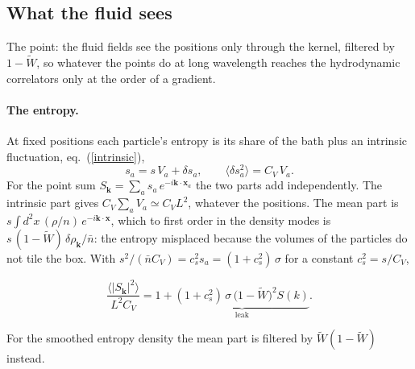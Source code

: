 \documentclass[11pt,aps,preprint,nofootinbib,superscriptaddress,tightenlines]{revtex4-2}
\newcommand{\avg}[1]{\langle #1\rangle}
\def\st{\begin{equation}}
\def\stp{\end{equation}}
\def\Eq#1{eq.~(\ref{#1})}
\let\oldparagraph\paragraph
\renewcommand{\paragraph}{\par\bigskip\oldparagraph}
\begin{document}
\subsection{What the fluid sees}
\label{sec:leak}

The point: the fluid fields see the positions only through the kernel, filtered by $1-\widetilde W$, so whatever the points do at long wavelength reaches the
hydrodynamic correlators only at the order of a gradient.

\paragraph{The entropy.}  At fixed positions each particle's entropy is its share of the bath plus an intrinsic fluctuation, \Eq{intrinsic},
\st
s_a=s\,V_a+\delta s_a,\qquad \avg{\delta s_a^2}=C_V\,V_a .
\stp
For the point sum $S_{\bm k}=\sum_as_a\,e^{-i\bm k\cdot\bm x_a}$ the two parts add independently.  The intrinsic part gives $C_V\sum_aV_a\simeq C_VL^2$, whatever the
positions.  The mean part is $s\int d^2x\,(\rho/n)\,e^{-i\bm k\cdot\bm x}$, which to first order in the density modes is $s\,(1-\widetilde W)\,\delta\rho_{\bm k}/\bar n$: the
entropy misplaced because the volumes of the particles do not tile the box.  With $s^2/(\bar nC_V)=c_s^2s_a=(1+c_s^2)\,\sigma$ for a constant $c_s^2=s/C_V$,
\begin{keyeq}
\st
\frac{\avg{|S_{\bm k}|^2}}{L^2C_V}=1+\underbrace{(1+c_s^2)\,\sigma\,\big(1-\widetilde W\big)^2S(k)}_{\text{leak}} .
\label{leak}
\stp
\end{keyeq}
For the smoothed entropy density the mean part is filtered by $\widetilde W(1-\widetilde W)$ instead.
\end{document}
